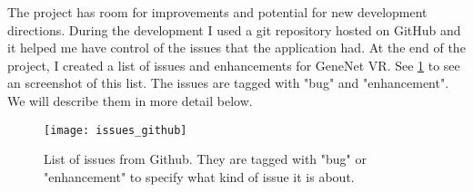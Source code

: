 The project has room for improvements and potential for new development directions. During the development I used a git repository hosted on GitHub and it helped me have control of the issues that the application had. At the end of the project, I created a list of issues and enhancements for GeneNet VR. See \ref{fig:issues} to see an screenshot of this list. The issues are tagged with "bug" and "enhancement". We will describe them in more detail below.

\begin{figure}[h!]
    \setlength{\tempheight}{15ex}
    \centering
    \texttt{[image: issues\_github]}
    \caption{List of issues from Github. They are tagged with "bug" or "enhancement" to specify what kind of issue it is about.}
    \label{fig:issues}
\end{figure}
